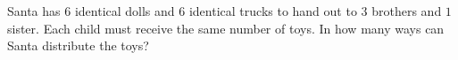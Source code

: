 Santa has $6$ identical dolls and $6$ identical trucks to hand out to $3$ brothers and $1$ sister. Each child must receive the same number of toys. In how many ways can Santa distribute the toys?
